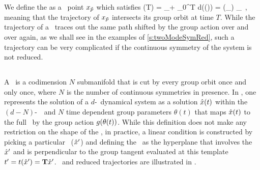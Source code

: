 We define the  \emph{ \rpo} as a \statesp\ point $x_{\tilde{p}}$ which satisfies
\beq
  \ssp (T) = \ssp_\rpprime  + \int_0^T d\tau \vel(\ssp (\tau)) = \LieEl (\theta_\rpprime ) \ssp_\rpprime
  \,,
meaning that the trajectory of $x_{\tilde{p}}$ intersects its group orbit at
time $T$. While the trajectory of a \rpo\ traces out the same path shifted
by the group action over and over again, as we shall see in the examples of
\ref{s:twoModeSymRed}, such a trajectory can be very complicated if the
continuous symmetry of the system is not reduced.

\subsection{\Mslices}
\label{s-slice}

A \emph{\slice} \pSRed\ is a codimension $N$ submanifold that is cut
by every group orbit once and only once, where $N$ is the number of continuous
symmetries in presence. In \emph{\mslices}, one represents the solution
of a $d$-\dmn\ dynamical system as a solution $\hat{x} (t)$ within the
$(d-N)$-\dmn\ \slice\  and $N$ time dependent group parameters $\theta(t)$
that maps $\hat{x} (t)$ to the full \statesp\ by the group action $g(\theta(t))$.
While this definition does not make any restriction on the shape of the
\slice, in practice, a linear condition is constructed by picking a
particular
\template\ (${\hat{x}'}$) and defining the \slicePlane\ as the hyperplane
that involves the \template\ ${\hat{x}'}$ and is perpendicular to the group
tangent evaluated at this template $t'_{} = t({\hat{x}'}) = \mathbf{T} {\hat{x}'}$.
\SlicePlane\ and reduced trajectories are illustrated in .

